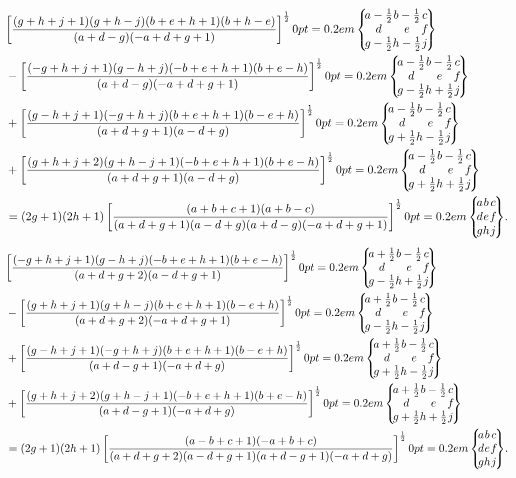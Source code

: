 \begin{align}
& {\left[\frac{(g+h+j+1)(g+h-j)(b+e+h+1)(b+h-e)}{(a+d-g)(-a+d+g+1)}\right]^{\frac{1}{2}}\ninej{a-\frac{1}{2}}{b-\frac{1}{2}}{c}{d}{e}{f}{g-\frac{1}{2}}{h-\frac{1}{2}}{j}}  \notag\\
& -\left[\frac{(-g+h+j+1)(g-h+j)(-b+e+h+1)(b+e-h)}{(a+d-g)(-a+d+g+1)}\right]^{\frac{1}{2}}\ninej{a-\frac{1}{2}}{b-\frac{1}{2}}{c}{d}{e}{f}{g-\frac{1}{2}}{h+\frac{1}{2}}{j}  \notag\\
& +\left[\frac{(g-h+j+1)(-g+h+j)(b+e+h+1)(b-e+h)}{(a+d+g+1)(a-d+g)}\right]^{\frac{1}{2}}\ninej{a-\frac{1}{2}}{b-\frac{1}{2}}{c}{d}{e}{f}{g+\frac{1}{2}}{h-\frac{1}{2}}{j}  \notag\\
& +\left[\frac{(g+h+j+2)(g+h-j+1)(-b+e+h+1)(b+e-h)}{(a+d+g+1)(a-d+g)}\right]^{\frac{1}{2}}\ninej{a-\frac{1}{2}}{b-\frac{1}{2}}{c}{d}{e}{f}{g+\frac{1}{2}}{h+\frac{1}{2}}{j}  \notag\\
& =(2 g+1)(2 h+1)\left[\frac{(a+b+c+1)(a+b-c)}{(a+d+g+1)(a-d+g)(a+d-g)(-a+d+g+1)}\right]^{\frac{1}{2}}\ninej{a}{b}{c}{d}{e}{f}{g}{h}{j} . \label{eq:10:5:8}
\end{align}
\begin{align}
& {\left[\frac{(-g+h+j+1)(g-h+j)(-b+e+h+1)(b+e-h)}{(a+d+g+2)(a-d+g+1)}\right]^{\frac{1}{2}}\ninej{a+\frac{1}{2}}{b-\frac{1}{2}}{c}{d}{e}{f}{g-\frac{1}{2}}{h+\frac{1}{2}}{j}}  \notag\\
& -\left[\frac{(g+h+j+1)(g+h-j)(b+e+h+1)(b-e+h)}{(a+d+g+2)(-a+d+g+1)}\right]^{\frac{1}{2}}\ninej{a+\frac{1}{2}}{b-\frac{1}{2}}{c}{d}{e}{f}{g-\frac{1}{2}}{h-\frac{1}{2}}{j}  \notag\\
& +\left[\frac{(g-h+j+1)(-g+h+j)(b+e+h+1)(b-e+h)}{(a+d-g+1)(-a+d+g)}\right]^{\frac{1}{2}}\ninej{a+\frac{1}{2}}{b-\frac{1}{2}}{c}{d}{e}{f}{g+\frac{1}{2}}{h-\frac{1}{2}}{j}  \notag\\
& +\left[\frac{(g+h+j+2)(g+h-j+1)(-b+e+h+1)(b+e-h)}{(a+d-g+1)(-a+d+g)}\right]^{\frac{1}{2}}\ninej{a+\frac{1}{2}}{b-\frac{1}{2}}{c}{d}{e}{f}{g+\frac{1}{2}}{h+\frac{1}{2}}{j}  \notag\\
& =(2 g+1)(2 h+1)\left[\frac{(a-b+c+1)(-a+b+c)}{(a+d+g+2)(a-d+g+1)(a+d-g+1)(-a+d+g)}\right]^{\frac{1}{2}}\ninej{a}{b}{c}{d}{e}{f}{g}{h}{j} . \label{eq:10:5:9}
\end{align}

